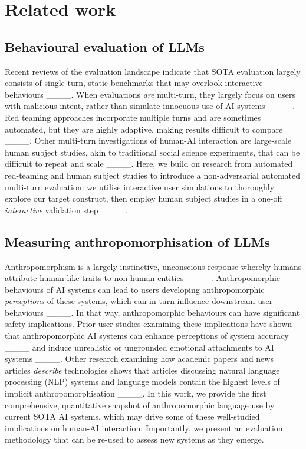 \section{Related work}
\label{sec:2}

\subsection{Behavioural evaluation of LLMs}\label{sec:2.1}
Recent reviews of the evaluation landscape indicate that SOTA evaluation largely consists of single-turn, static benchmarks that may overlook interactive behaviours ____. When evaluations \emph{are} multi-turn, they largely focus on users with malicious intent, rather than simulate innocuous use of AI systems ____. Red teaming approaches incorporate multiple turns and are sometimes automated, but they are highly adaptive, making results difficult to compare ____. Other multi-turn investigations of human-AI interaction are large-scale human subject studies, akin to traditional social science experiments, that can be difficult to repeat and scale ____. Here, we build on research from automated red-teaming and human subject studies to introduce a non-adversarial automated multi-turn evaluation: we utilise interactive user simulations to thoroughly explore our target construct, then employ human subject studies in a one-off \textit{interactive} validation step ____. 

\subsection{Measuring anthropomorphisation of LLMs}\label{sec:2.2}
Anthropomorphism is a largely instinctive, unconscious response whereby humans attribute human-like traits to non-human entities ____.  Anthropomorphic behaviours of AI systems can lead to users developing anthropomorphic \emph{perceptions} of these systems, which can in turn influence downstream user behaviours ____. In that way, anthropomorphic behaviours can have significant safety implications. Prior user studies examining these implications have shown that anthropomorphic AI systems can enhance perceptions of system accuracy ____ and induce unrealistic or ungrounded emotional attachments to AI systems ____. Other research examining how academic papers and news articles \textit{describe} technologies shows that articles discussing natural language processing (NLP) systems and language models contain the highest levels of implicit anthropomorphisation ____. In this work, we provide the first comprehensive, quantitative snapshot of anthropomorphic language use by current SOTA AI systems, which may drive some of these well-studied implications on human-AI interaction. Importantly, we present an evaluation methodology that can be re-used to assess new systems as they emerge.